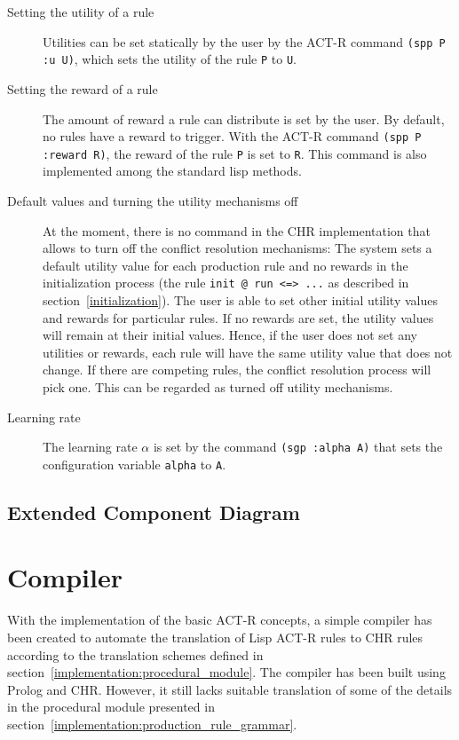 \begin{description}
 \item[Setting the utility of a rule] Utilities can be set statically by the user by the ACT-R command \lstinline|(spp P :u U)|, which sets the utility of the rule \lstinline|P| to \lstinline|U|.
 \item[Setting the reward of a rule] The amount of reward a rule can distribute is set by the user. By default, no rules have a reward to trigger. With the ACT-R command \lstinline|(spp P :reward R)|, the reward of the rule \lstinline|P| is set to \lstinline|R|. This command is also implemented among the standard lisp methods.  
 \item[Default values and turning the utility mechanisms off] At the moment, there is no command in the CHR implementation that allows to turn off the conflict resolution mechanisms: The system sets a default utility value for each production rule and no rewards in the initialization process (the rule \lstinline|init @ run <=> ...| as described in section~\ref{initialization}). The user is able to set other initial utility values and rewards for particular rules. If no rewards are set, the utility values will remain at their initial values. Hence, if the user does not set any utilities or rewards, each rule will have the same utility value that does not change. If there are competing rules, the conflict resolution process will pick one. This can be regarded as turned off utility mechanisms.
 \item[Learning rate] The learning rate $\alpha$ is set by the command \lstinline|(sgp :alpha A)| that sets the configuration variable \lstinline|alpha| to \lstinline|A|.
\end{description}

\subsection{Extended Component Diagram}

\section{Compiler}

With the implementation of the basic ACT-R concepts, a simple compiler has been created to automate the translation of Lisp ACT-R rules to CHR rules according to the translation schemes defined in section~\ref{implementation:procedural_module}. The compiler has been built using Prolog and CHR. However, it still lacks suitable translation of some of the details in the procedural module presented in section~\ref{implementation:production_rule_grammar}.

